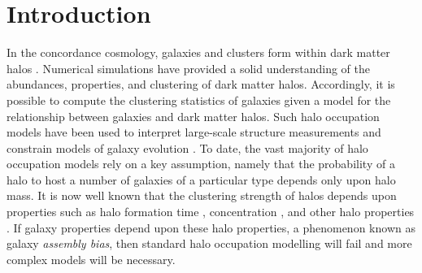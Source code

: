 \documentclass[usenatbib,fleqn]{mnras}
\begin{document}
\section{Introduction}
\label{section:introduction}

In the concordance cosmology, galaxies and clusters form within dark matter halos \citep{white_rees78,blumenthal_etal84, mo_etal10}. Numerical simulations have provided a solid understanding of the abundances, properties, and clustering of dark matter halos. Accordingly, it is possible to compute the clustering statistics of galaxies given a model for the relationship between galaxies and dark matter halos. 
Such halo occupation models have been used to interpret large-scale structure measurements and 
constrain models of galaxy evolution \citep{yang_etal03,tinker_etal05,zehavi_etal05b,porciani_norberg06,vdbosch_etal07,zheng_etal07,conroy_wechsler09,
yang_etal09b,zehavi_etal11,guo_etal11a,wake_etal11,yang_etal11a,yang_etal12,leauthaud_etal12,
rodriguezpuebla_etal12, behroozi_etal13b, moster_etal13, tinker_etal13,cacciato_etal13,more_etal13,guo_etal14,
zu_mandelbaum15b}.
To date, the vast majority of halo occupation models rely on a key assumption, namely that the probability of a halo to host a number of galaxies of a particular type depends only upon halo mass. It is now well known that the clustering strength of halos depends upon properties such as halo formation time \citep{gao_etal05,harker_etal06, wechsler_etal06,gao_white07,croton_etal07,zentner07,dalal_etal08, li_etal08, lacerna_padilla11}, concentration \citep{wechsler_etal06,faltenbacher_white10, mao_etal15}, and other halo properties \citep{bett_etal07, hahn_etal07a, hahn_etal07b, faltenbacher_white10, vandaalen_etal12, fisher_faltenbacher16, sunayama_etal16, chavesmontero_etal16}. If galaxy properties depend upon these halo properties, a phenomenon known as galaxy {\em assembly bias}, then standard halo occupation modelling will fail \citep{zentner_etal14} and more complex models \citep{gilmarin_etal11, hearin_etal16} will be necessary.
\end{document}
